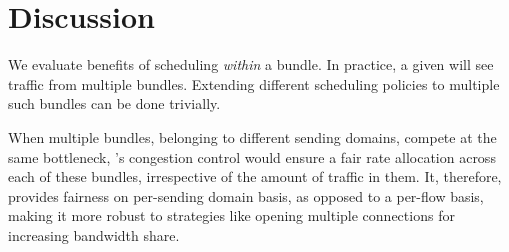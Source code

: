 \section{Discussion}\label{s:discussion}

 We evaluate benefits of scheduling \emph{within} a bundle. In practice, a given \inbox will see traffic from multiple bundles. Extending different scheduling policies to multiple such bundles can be done trivially.

 When multiple bundles, belonging to different sending domains, compete at the same bottleneck, \name's congestion control would ensure a fair rate allocation across each of these bundles, irrespective of the amount of traffic in them. It, therefore, provides fairness on per-sending domain basis, as opposed to a per-flow basis, making it more robust to strategies like opening multiple connections for increasing bandwidth share. 






